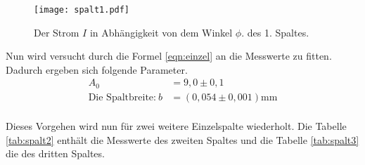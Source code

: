 \begin{figure}
  \centering
  \texttt{[image: spalt1.pdf]}
  \caption{ Der Strom $I$ in Abhängigkeit von dem Winkel $\phi$. des 1. Spaltes.}
  \label{fig:spalt1}
\end{figure}
\FloatBarrier
Nun wird versucht durch die Formel \eqref{eqn:einzel} an die Messwerte zu fitten.
Dadurch ergeben sich folgende Parameter.
\begin{align*}
  A_0&=9,0\pm0,1\\
  \text{Die Spaltbreite:} \ b&=(0,054\pm0,001)\si{\milli\meter}\\
\end{align*}

Dieses Vorgehen wird nun für zwei weitere Einzelspalte wiederholt.
Die Tabelle \ref{tab:spalt2} enthält die Messwerte des zweiten Spaltes
und die Tabelle \ref{tab:spalt3} die des dritten Spaltes.




